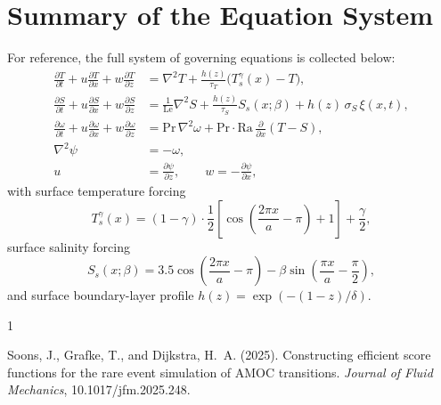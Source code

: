 \documentclass[12pt, a4paper]{article}
\renewcommand{\Pr}{\mathrm{Pr}}
\newcommand{\Le}{\mathrm{Le}}
\newcommand{\Ra}{\mathrm{Ra}}
\newcommand{\pd}[2]{\frac{\partial #1}{\partial #2}}
\newcommand{\lap}{\nabla^2}
\begin{document}
\section{Summary of the Equation System}
\label{sec:summary}

For reference, the full system of governing equations is collected below:
\begin{align}
  \pd{T}{t} + u\pd{T}{x} + w\pd{T}{z}
    &= \lap T + \frac{h(z)}{\tau_T}\bigl(T_s^\gamma(x) - T\bigr),
    \label{eq:full_T}\\[4pt]
  \pd{S}{t} + u\pd{S}{x} + w\pd{S}{z}
    &= \frac{1}{\Le}\lap S + \frac{h(z)}{\tau_S}S_s(x;\beta)
       + h(z)\,\sigma_S\,\xi(x,t),
    \label{eq:full_S}\\[4pt]
  \pd{\omega}{t} + u\pd{\omega}{x} + w\pd{\omega}{z}
    &= \Pr\,\lap\omega + \Pr\cdot\Ra\,\pd{}{x}(T - S),
    \label{eq:full_omega}\\[4pt]
  \lap\psi &= -\omega,
    \label{eq:full_psi}\\[4pt]
  u &= \pd{\psi}{z}, \qquad w = -\pd{\psi}{x},
    \label{eq:full_vel}
\end{align}
with surface temperature forcing
\begin{equation}
  T_s^\gamma(x) = (1-\gamma)\cdot\frac{1}{2}\!\left[
    \cos\!\!\left(\frac{2\pi x}{a} - \pi\right) + 1
  \right] + \frac{\gamma}{2},
\end{equation}
surface salinity forcing
\begin{equation}
  S_s(x;\beta) = 3.5\cos\!\!\left(\frac{2\pi x}{a} - \pi\right)
               - \beta\sin\!\!\left(\frac{\pi x}{a} - \frac{\pi}{2}\right),
\end{equation}
and surface boundary-layer profile $h(z) = \exp(-(1-z)/\delta)$.


\begin{thebibliography}{1}

Soons, J., Grafke, T., and Dijkstra, H.~A. (2025).
\newblock Constructing efficient score functions for the rare event simulation
  of {AMOC} transitions.
\newblock \emph{Journal of Fluid Mechanics}, 10.1017/jfm.2025.248.

\end{thebibliography}
\end{document}
